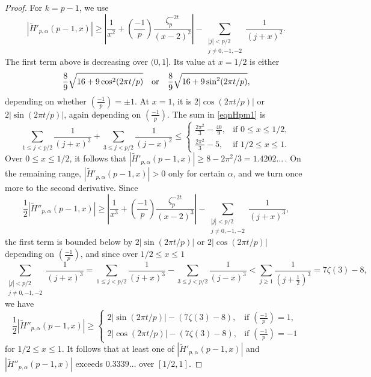 \documentclass[reqno]{amsart}
\numberwithin{equation}{section}
\numberwithin{table}{section}
\numberwithin{figure}{section}
\newcommand\thinsp{5pt}
\newcommand{\leg}[2]{\left(\frac{#1}{#2}\right)}
\newcommand{\abs}[1]{\left\lvert#1\right\rvert}
\begin{document}
\begin{proof}
For $k=p-1$, we use
\begin{equation}\label{eqnHpm1}
\abs{\widetilde{H}'_{p,\alpha}(p-1,x)}
\geq
 \abs{\frac{1}{x^2} +\leg{-1}{p} \frac{\zeta_p^{-2t}}{(x-2)^2}} - \sum_{\substack{\abs{j}<p/2\\j\neq0,-1,-2}} \frac{1}{(j+x)^2}.
\end{equation}
The first term above is decreasing over $(0,1]$.
Its value at $x=1/2$ is either
\[
\frac{8}{9}\sqrt{16+9\cos^2(2\pi t/p)\vphantom{\sin^2}}
\quad\textrm{or}\quad
\frac{8}{9}\sqrt{16+9\sin^2(2\pi t/p)},
\]
depending on whether $\leg{-1}{p}=\pm1$.
At $x=1$, it is $2\abs{\cos(2\pi t/p)}$ or $2\abs{\sin(2\pi t/p)}$, again depending on $\leg{-1}{p}$.
The sum in \eqref{eqnHpm1} is
\[
\sum_{1\leq j<p/2} \frac{1}{(j+x)^2} + \sum_{3\leq j<p/2} \frac{1}{(j-x)^2} \leq
\begin{cases}
\frac{2\pi^2}{3} - \frac{40}{9}, & \textrm{if $0\leq x\leq 1/2$},\\[\thinsp]
\frac{2\pi^2}{3} - 5, & \textrm{if $1/2\leq x\leq 1$}.
\end{cases}
\]
Over $0\leq x\leq1/2$, it follows that $|\widetilde{H}'_{p,\alpha}(p-1,x)| \geq 8-2\pi^2/3 = 1.4202\ldots\,$.
On the remaining range, $|\widetilde{H}'_{p,\alpha}(p-1,x)| > 0$ only for certain $\alpha$, and we turn once more to the second derivative.
Since
\[
\frac{1}{2}\abs{\widetilde{H}''_{p,\alpha}(p-1,x)}
\geq
 \abs{\frac{1}{x^3} +\leg{-1}{p} \frac{\zeta_p^{-2t}}{(x-2)^3}} - \sum_{\substack{\abs{j}<p/2\\j\neq0,-1,-2}} \frac{1}{(j+x)^3},
\]
the first term is bounded below by $2\abs{\sin(2\pi t/p)}$ or $2\abs{\cos(2\pi t/p)}$ depending on $\leg{-1}{p}$, and since over $1/2\leq x\leq1$
\[
\sum_{\substack{\abs{j}<p/2\\j\neq0,-1,-2}} \frac{1}{(j+x)^3}
= \!\!\sum_{1\leq j<p/2} \frac{1}{(j+x)^3}
- \!\!\sum_{3\leq j<p/2} \frac{1}{(j-x)^3}
< \sum_{j\geq1} \frac{1}{(j+\frac{1}{2})^3}
= 7\zeta(3) - 8,
\]
we have
\[
\frac{1}{2} \abs{\widetilde{H}''_{p,\alpha}(p-1,x)} \geq
\begin{cases}
2\abs{\sin(2\pi t/p)} - \left(7\zeta(3) - 8\right), & \textrm{if $\leg{-1}{p}=1$},\\[\thinsp]
2\abs{\cos(2\pi t/p)} - \left(7\zeta(3) - 8\right), & \textrm{if $\leg{-1}{p}=-1$}
\end{cases}
\]
for $1/2\leq x\leq1$.
It follows that at least one of $|\widetilde{H}'_{p,\alpha}(p-1,x)|$ and $|\widetilde{H}''_{p,\alpha}(p-1,x)|$ exceeds $0.3339\ldots$ over $[1/2,1]$.


\end{proof}
\end{document}
